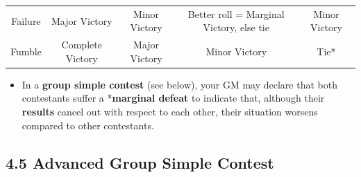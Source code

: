 \documentclass[
]{article}
\providecommand{\tightlist}{%
  \setlength{\itemsep}{0pt}\setlength{\parskip}{0pt}}
\begin{document}
\begin{longtable}[]{@{}ccccc@{}}
\begin{minipage}[t]{0.10\columnwidth}\centering
Failure\strut
\end{minipage} & \begin{minipage}[t]{0.18\columnwidth}\centering
Major Victory\strut
\end{minipage} & \begin{minipage}[t]{0.19\columnwidth}\centering
Minor Victory\strut
\end{minipage} & \begin{minipage}[t]{0.19\columnwidth}\centering
Better roll = Marginal Victory, else tie\strut
\end{minipage} & \begin{minipage}[t]{0.19\columnwidth}\centering
Minor Victory\strut
\end{minipage}\tabularnewline
\begin{minipage}[t]{0.10\columnwidth}\centering
Fumble\strut
\end{minipage} & \begin{minipage}[t]{0.18\columnwidth}\centering
Complete Victory\strut
\end{minipage} & \begin{minipage}[t]{0.19\columnwidth}\centering
Major Victory\strut
\end{minipage} & \begin{minipage}[t]{0.19\columnwidth}\centering
Minor Victory\strut
\end{minipage} & \begin{minipage}[t]{0.19\columnwidth}\centering
Tie*\strut
\end{minipage}\tabularnewline
\bottomrule
\end{longtable}

\begin{itemize}
\tightlist
\item
  In a \textbf{group simple contest} (see below), your GM may declare
  that both contestants suffer a *\textbf{marginal defeat} to indicate
  that, although their \textbf{results} cancel out with respect to each
  other, their situation worsens compared to other contestants.
\end{itemize}

\hypertarget{advanced-group-simple-contest}{%
\subsection{4.5 Advanced Group Simple
Contest}\label{advanced-group-simple-contest}}
\end{document}
